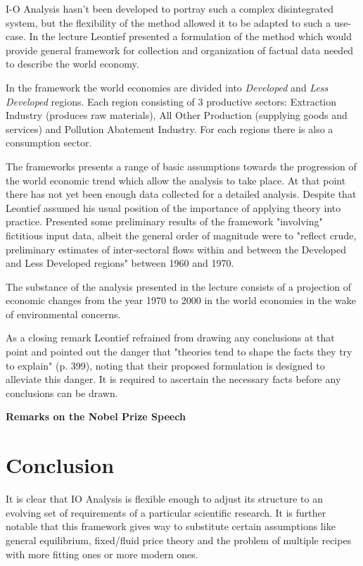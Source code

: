\documentclass[12pt,a4paper]{scrartcl}
\begin{document}
	I-O Analysis hasn't been developed to portray such a complex disintegrated system, but the flexibility of the method allowed it to be adapted to such a use-case. In the lecture Leontief presented a formulation of the method which would provide general framework for collection and organization of factual data needed to describe the world economy.
	
	In the framework the world economies are divided into \textit{Developed} and \textit{Less Developed} regions. Each region consisting of 3 productive sectors: Extraction Industry (produces raw materials), All Other Production (supplying goods and services) and Pollution Abatement Industry. For each regions there is also a consumption sector.
	
	The frameworks presents a range of basic assumptions towards the progression of the world economic trend which allow the analysis to take place. At that point there has not yet been enough data collected for a detailed analysis. Despite that Leontief assumed his usual position of the importance of applying theory into practice. Presented some preliminary results of the framework "involving" fictitious input data, albeit the general order of magnitude were to "reflect crude, preliminary estimates of inter-sectoral flows within and between the Developed and Less Developed regions" \cite[p. 389]{leontief1974} between 1960 and 1970.
	
	The substance of the analysis presented in the lecture consists of a projection of economic changes from the year 1970 to 2000 in the world economies in the wake of environmental concerns. 
	
	As a closing remark Leontief refrained from drawing any conclusions at that point and pointed out the danger that "theories tend to shape the facts they try to explain" (p. 399), noting that their proposed formulation is designed to alleviate this danger. It is required to ascertain the necessary facts before any conclusions can be drawn. \cite[pp. 387-401]{leontief1974}
	
	\textbf{Remarks on the Nobel Prize Speech}
	
		

	\section{Conclusion}
	
	It is clear that IO Analysis is flexible enough to adjust its structure to an evolving set of requirements of a particular scientific research. It is further notable that this framework gives way to substitute certain assumptions like general equilibrium, fixed/fluid price theory and the problem of multiple recipes  with more fitting ones or more modern ones. 
	
\end{document}
